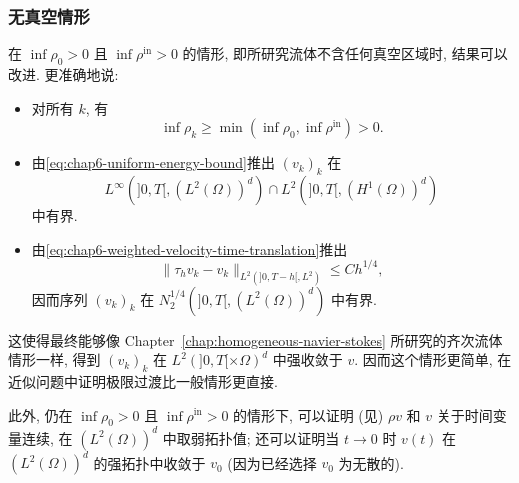 \begin{sloppypar}
\subsubsection{无真空情形}
\label{subsec:chap6-without-vacuum}

在 $\inf\rho_0>0$ 且 $\inf\rho^{\mathrm{in}}>0$ 的情形, 即所研究流体不含任何真空区域时, 结果可以改进. 更准确地说:
\begin{itemize}
 \item 对所有 $k$, 有
 \[
  \inf\rho_k\geq\min(\inf\rho_0,\inf\rho^{\mathrm{in}})>0.
 \]
 \item 由\eqref{eq:chap6-uniform-energy-bound}推出 $(v_k)_k$ 在
 \[
  L^\infty(]0,T[,(L^2(\Omega))^d)
  \cap L^2(]0,T[,(H^1(\Omega))^d)
 \]
 中有界.
 \item 由\eqref{eq:chap6-weighted-velocity-time-translation}推出
 \[
  \|\tau_hv_k-v_k\|_{L^2(]0,T-h[,L^2)}\leq Ch^{1/4},
 \]
 因而序列 $(v_k)_k$ 在 $N_2^{1/4}(]0,T[,(L^2(\Omega))^d)$ 中有界.
\end{itemize}
这使得最终能够像 Chapter~\ref{chap:homogeneous-navier-stokes} 所研究的齐次流体情形一样, 得到 $(v_k)_k$ 在 $L^2(]0,T[\times\Omega)^d$ 中强收敛于 $v$. 因而这个情形更简单, 在近似问题中证明极限过渡比一般情形更直接.

此外, 仍在 $\inf\rho_0>0$ 且 $\inf\rho^{\mathrm{in}}>0$ 的情形下, 可以证明 (见) $\rho v$ 和 $v$ 关于时间变量连续, 在 $(L^2(\Omega))^d$ 中取弱拓扑值; 还可以证明当 $t\to0$ 时 $v(t)$ 在 $(L^2(\Omega))^d$ 的强拓扑中收敛于 $v_0$ (因为已经选择 $v_0$ 为无散的).
\end{sloppypar}
